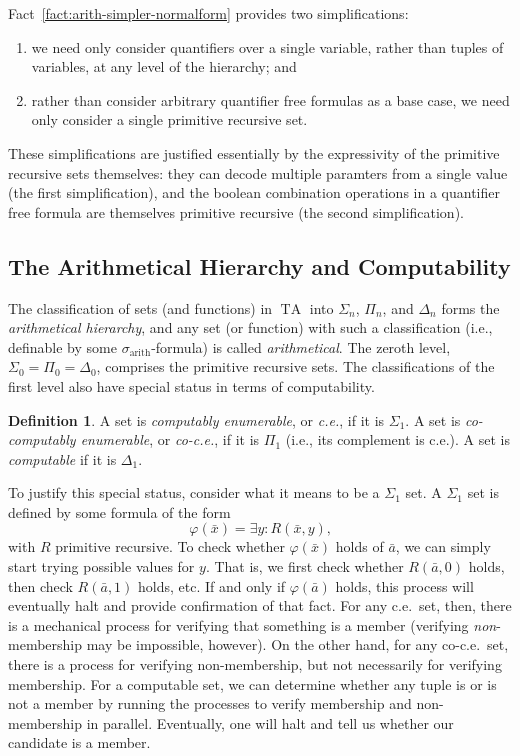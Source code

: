 \documentclass{article}
\theoremstyle{plain}
\theoremstyle{definition}
\newtheorem{defn}[thm]{Definition}
\newcommand{\defterm}{\emph}
\newcommand{\arithsig}{\sigma_{\operatorname{arith}}}
\newcommand{\tuple}{\bar}
\DeclareMathOperator{\TA}{TA}
\renewcommand{\phi}{\varphi}
\begin{document}
Fact~\ref{fact:arith-simpler-normalform} provides two simplifications:
\begin{enumerate}
\item we need only consider quantifiers over a single variable, rather
  than tuples of variables, at any level of the hierarchy; and
\item rather than consider arbitrary quantifier free formulas as a
  base case, we need only consider a single primitive recursive set.
\end{enumerate}
These simplifications are justified essentially by the expressivity of
the primitive recursive sets themselves: they can decode multiple
paramters from a single value (the first simplification), and the
boolean combination operations in a quantifier free formula are
themselves primitive recursive (the second simplification).

\subsection{The Arithmetical Hierarchy and Computability}

The classification of sets (and functions) in $\TA$ into $\Sigma_n$,
$\Pi_n$, and $\Delta_n$ forms the \defterm{arithmetical hierarchy},
and any set (or function) with such a classification (i.e., definable
by some $\arithsig$-formula) is called \defterm{arithmetical}. The
zeroth level, $\Sigma_0 = \Pi_0 = \Delta_0$, comprises the primitive
recursive sets. The classifications of the first level also have
special status in terms of computability.

\begin{defn}
  A set is \defterm{computably enumerable}, or \defterm{c.e.}, if it
  is $\Sigma_1$. A set is \defterm{co-computably enumerable}, or
  \defterm{co-c.e.}, if it is $\Pi_1$ (i.e., its complement is
  c.e.). A set is \defterm{computable} if it is $\Delta_1$.
\end{defn}

To justify this special status, consider what it means to be a
$\Sigma_1$ set. A $\Sigma_1$ set is defined by some formula of the
form $$\phi(\tuple{x}) = \exists y : R(\tuple{x},y)\text{,}$$ with $R$
primitive recursive. To check whether $\phi(\tuple{x})$ holds of
$\tuple{a}$, we can simply start trying possible values for $y$. That
is, we first check whether $R(\tuple{a},0)$ holds, then check
$R(\tuple{a},1)$ holds, etc. If and only if $\phi(\tuple{a})$ holds,
this process will eventually halt and provide confirmation of that
fact. For any c.e.\ set, then, there is a mechanical process for
verifying that something is a member (verifying \emph{non}-membership
may be impossible, however). On the other hand, for any co-c.e.\ set,
there is a process for verifying non-membership, but not necessarily
for verifying membership. For a computable set, we can determine
whether any tuple is or is not a member by running the processes to
verify membership and non-membership in parallel. Eventually, one will
halt and tell us whether our candidate is a member.
\end{document}
